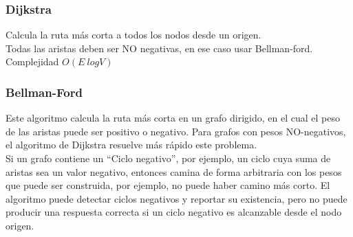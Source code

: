 \documentclass[10pt,letterpaper,twocolumn,twosided]{article}
\newcommand{\codigofuente}[1]{

\dotfill
}
\begin{document}
\subsubsection{Dijkstra}

Calcula la ruta más corta a todos los nodos desde un origen.\\
Todas las aristas deben ser NO negativas, en ese caso usar Bellman-ford.\\
Complejidad $O(E\ log V)$

\codigofuente{../src/graphs/dijkstra.${EXT}}%


\subsubsection{Bellman-Ford}
Este algoritmo calcula la ruta más corta en un grafo dirigido, en el cual el peso de las aristas puede 
ser positivo o negativo. Para grafos con pesos NO-negativos, el algoritmo de Dijkstra resuelve más
rápido este problema.\\


Si un grafo contiene un ``Ciclo negativo'', por ejemplo, un ciclo cuya suma de aristas sea un valor negativo,
entonces camina de forma arbitraria con los pesos que puede ser construida, por ejemplo, no puede haber camino más corto.
El algoritmo puede detectar ciclos negativos y reportar su existencia, pero no puede producir una respuesta correcta
si un ciclo negativo es alcanzable desde el nodo origen.\\
\end{document}
